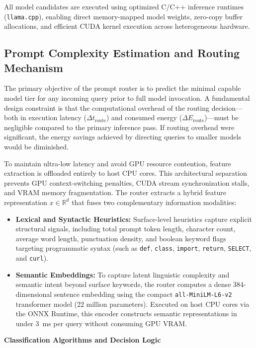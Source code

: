 \documentclass[runningheads]{llncs}
\begin{document}
All model candidates are executed using optimized C/C++ inference runtimes (\texttt{llama.cpp}), enabling direct memory-mapped model weights, zero-copy buffer allocations, and efficient CUDA kernel execution across heterogeneous hardware.

\subsection{Prompt Complexity Estimation and Routing Mechanism}
\label{subsec:prompt-routing}

The primary objective of the prompt router is to predict the minimal capable model tier for any incoming query prior to full model invocation. A fundamental design constraint is that the computational overhead of the routing decision—both in execution latency ($\Delta t_{\text{route}}$) and consumed energy ($\Delta E_{\text{route}}$)—must be negligible compared to the primary inference pass. If routing overhead were significant, the energy savings achieved by directing queries to smaller models would be diminished.

To maintain ultra-low latency and avoid GPU resource contention, feature extraction is offloaded entirely to host CPU cores. This architectural separation prevents GPU context-switching penalties, CUDA stream synchronization stalls, and VRAM memory fragmentation. The router extracts a hybrid feature representation $x \in \mathbb{R}^d$ that fuses two complementary information modalities:
\begin{itemize}
    \item \textbf{Lexical and Syntactic Heuristics:} Surface-level heuristics capture explicit structural signals, including total prompt token length, character count, average word length, punctuation density, and boolean keyword flags targeting programmatic syntax (such as \texttt{def}, \texttt{class}, \texttt{import}, \texttt{return}, \texttt{SELECT}, and \texttt{curl}).
    \item \textbf{Semantic Embeddings:} To capture latent linguistic complexity and semantic intent beyond surface keywords, the router computes a dense 384-dimensional sentence embedding using the compact \texttt{all-MiniLM-L6-v2} transformer model (22 million parameters). Executed on host CPU cores via the ONNX Runtime, this encoder constructs semantic representations in under 3~ms per query without consuming GPU VRAM.
\end{itemize}

\vspace{1em}
\noindent\textbf{Classification Algorithms and Decision Logic}
\end{document}
